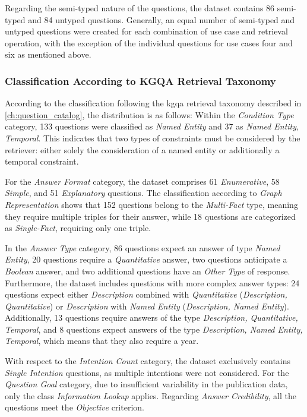 Regarding the semi-typed nature of the questions, the dataset contains 86 semi-typed and 84 untyped questions. Generally, an equal number of semi-typed and untyped questions were created for each combination of use case and retrieval operation, with the exception of the individual questions for use cases four and six as mentioned above.

\subsubsection{Classification According to KGQA Retrieval Taxonomy} 

According to the classification following the \gls{kgqa} retrieval taxonomy described in \autoref{ch:question_catalog}, the distribution is as follows: Within the \emph{Condition Type} category, 133 questions were classified as \emph{Named Entity} and 37 as \emph{Named Entity, Temporal}. This indicates that two types of constraints must be considered by the retriever: either solely the consideration of a named entity or additionally a temporal constraint.

For the \emph{Answer Format} category, the dataset comprises 61 \emph{Enumerative}, 58 \emph{Simple}, and 51 \emph{Explanatory} questions. The classification according to \emph{Graph Representation} shows that 152 questions belong to the \emph{Multi-Fact} type, meaning they require multiple triples for their answer, while 18 questions are categorized as \emph{Single-Fact}, requiring only one triple.

In the \emph{Answer Type} category, 86 questions expect an answer of type \emph{Named Entity}, 20 questions require a \emph{Quantitative} answer, two questions anticipate a \emph{Boolean} answer, and two additional questions have an \emph{Other Type} of response. Furthermore, the dataset includes questions with more complex answer types: 24 questions expect either \emph{Description} combined with \emph{Quantitative} (\emph{Description, Quantitative}) or \emph{Description} with \emph{Named Entity} (\emph{Description, Named Entity}). Additionally, 13 questions require answers of the type \emph{Description, Quantitative, Temporal}, and 8 questions expect answers of the type \emph{Description, Named Entity, Temporal}, which means that they also require a year.

With respect to the \emph{Intention Count} category, the dataset exclusively contains \emph{Single Intention} questions, as multiple intentions were not considered. For the \emph{Question Goal} category, due to insufficient variability in the publication data, only the class \emph{Information Lookup} applies. Regarding \emph{Answer Credibility}, all the questions meet the \emph{Objective} criterion.

